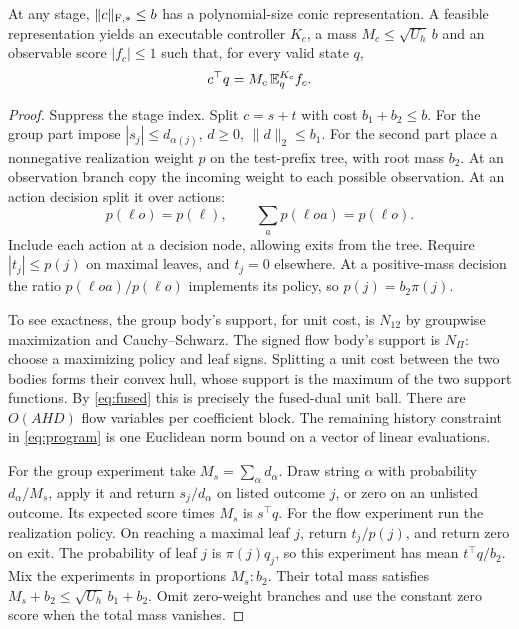 \begin{lemma}\label{lem:score}
At any stage, $\lVert c\rVert_{\mathrm F,*}\le b$ has a polynomial-size conic representation. A feasible representation yields an executable controller $K_c$, a mass $M_c\le\sqrt{U_h}\,b$ and an observable score $|f_c|\le1$ such that, for every valid state $q$,
\begin{equation}
 c^\top q=M_c\,\mathbb E_q^{K_c}f_c .
 \label{eq:scored}
\end{equation}
\end{lemma}
\begin{proof}
Suppress the stage index. Split $c=s+t$ with cost $b_1+b_2\le b$. For the group part impose $|s_j|\le d_{\alpha(j)}$, $d\ge0$, $\|d\|_2\le b_1$. For the second part place a nonnegative realization weight $p$ on the test-prefix tree, with root mass $b_2$. At an observation branch copy the incoming weight to each possible observation. At an action decision split it over actions:
\[
 p(\ell o)=p(\ell),\qquad
 \textstyle\sum_a p(\ell oa)=p(\ell o).
\]
Include each action at a decision node, allowing exits from the tree. Require $|t_j|\le p(j)$ on maximal leaves, and $t_j=0$ elsewhere. At a positive-mass decision the ratio $p(\ell oa)/p(\ell o)$ implements its policy, so $p(j)=b_2\pi(j)$.

To see exactness, the group body's support, for unit cost, is $N_{12}$ by groupwise maximization and Cauchy--Schwarz. The signed flow body's support is $N_\Pi$: choose a maximizing policy and leaf signs. Splitting a unit cost between the two bodies forms their convex hull, whose support is the maximum of the two support functions. By \eqref{eq:fused} this is precisely the fused-dual unit ball. There are $O(AHD)$ flow variables per coefficient block. The remaining history constraint in \eqref{eq:program} is one Euclidean norm bound on a vector of linear evaluations.

For the group experiment take $M_s=\sum_\alpha d_\alpha$. Draw string $\alpha$ with probability $d_\alpha/M_s$, apply it and return $s_j/d_\alpha$ on listed outcome $j$, or zero on an unlisted outcome. Its expected score times $M_s$ is $s^\top q$. For the flow experiment run the realization policy. On reaching a maximal leaf $j$, return $t_j/p(j)$, and return zero on exit. The probability of leaf $j$ is $\pi(j)q_j$, so this experiment has mean $t^\top q/b_2$. Mix the experiments in proportions $M_s:b_2$. Their total mass satisfies $M_s+b_2\le\sqrt{U_h}\,b_1+b_2$. Omit zero-weight branches and use the constant zero score when the total mass vanishes.
\end{proof}

